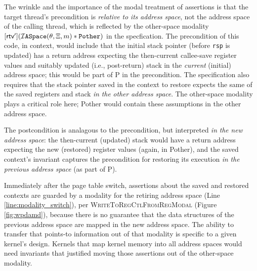 The wrinkle and the importance of the modal treatment of assertions is that the target thread's precondition is \emph{relative to its address space}, 
not the address space of the calling thread, which is reflected by
the other-space modality
$[\textsf{rtv}'](\mathcal{I}\texttt{ASpace}(\theta,\Xi,m) \ast \texttt{Pother})$
in the specfication. 
The precondition of this code,
in context, would include that the initial stack pointer (before \lstinline|rsp| is updated)
has a return address expecting the then-current callee-save register values and 
suitably updated (i.e., post-return) stack in the \emph{current} (initial) address space;
this would be part of \textsf{P} in the precondition.
The specification also requires that
the stack pointer saved in the context to restore expects the same of the saved registers and stack
\emph{in the other address space}. 
The other-space modality plays a critical role here; \textsf{Pother} would contain these assumptions in the other
address space.


The postcondition is analagous to the precondition, but interpreted \emph{in the new address space}: the then-current (updated) stack would have a return address expecting the new (restored) register values (again, in \textsf{Pother}),
and the saved context's invariant captures the precondition for restoring its execution \emph{in the previous address space} (as part of \textsf{P}). 

Immediately after the page table switch, assertions about the saved and restored contexts are
guarded by a modality for the retiring
address space \rtv{} (Line \ref{line:modality_switch}), per
\textsc{WriteToRegCtlFromRegModal} (Figure \ref{fig:wpdamd}),
because
there is no guarantee that the data structures of the previous address space are mapped in the new address space.
The ability to transfer that points-to information out of that modality is specific to a given kernel's design. 
Kernels that map kernel memory into all address spaces would need invariants
that justified moving those assertions out of the other-space modality.

